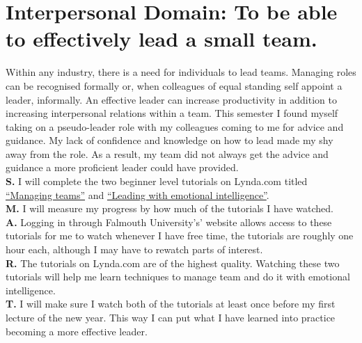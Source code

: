 \documentclass{scrartcl}
\begin{document}
\section{Interpersonal Domain: To be able to effectively lead a small team.}
 Within any industry, there is a need for individuals to lead teams. Managing roles can be recognised formally or, when colleagues of equal standing self appoint a leader, informally. An effective leader can increase productivity in addition to increasing interpersonal relations within a team. This semester I found myself taking on a pseudo-leader role with my colleagues coming to me for advice and guidance. My lack of confidence and knowledge on how to lead made my shy away from the role. As a result, my team did not always get the advice and guidance a more proficient leader could have provided.\\
\textbf{S.} I will complete the two beginner level tutorials on Lynda.com titled \href{https://www.lynda.com/course-tutorials/Managing-Teams-2018/746304-2.html}{``Managing teams''} and  \href{https://www.lynda.com/Leadership-Management-tutorials/Inspirational-leadership/756283/5006410-4.html}{``Leading with emotional intelligence''}. \\
\textbf{M.}  I will measure my progress by how much of the tutorials I have watched. \\
\textbf{A.}  Logging in through Falmouth University's' website allows access to these tutorials for me to watch whenever I have free time, the tutorials are roughly one hour each, although I may have to rewatch parts of interest.\\
\textbf{R.} The tutorials on Lynda.com are of the highest quality. Watching these two tutorials will help me learn techniques to manage team and do it with emotional intelligence. \\
\textbf{T.} I will make sure I watch both of the tutorials at least once before my first lecture of the new year. This way I can put what I have learned into practice becoming a more effective leader.\\
\end{document}

